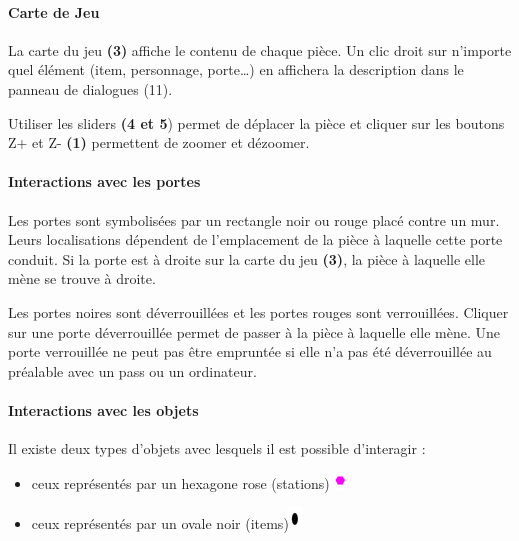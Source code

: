 \documentclass[./standalone.tex]{subfiles}
\begin{document}
\newpage


\paragraph{Carte de Jeu\\}
    La carte du jeu \textbf{(3)} affiche le contenu de chaque pièce. Un clic droit sur n’importe quel élément (item, personnage, porte…) en affichera la description dans le panneau de dialogues (11).
\par Utiliser les sliders \textbf{(4 et 5}) permet de déplacer la pièce et cliquer sur les boutons Z+ et Z- \textbf{(1)} permettent de zoomer et dézoomer.

\paragraph{Interactions avec les portes\\}
    Les portes sont symbolisées par un rectangle noir ou rouge placé contre un mur. Leurs localisations dépendent de l’emplacement de la pièce à laquelle cette porte conduit. Si la porte est à droite sur la carte du jeu \textbf{(3)}, la pièce à laquelle elle mène se trouve à droite. 
\par Les portes noires sont déverrouillées et les portes rouges sont verrouillées. Cliquer sur une porte déverrouillée permet de passer à la pièce à laquelle elle mène. Une porte verrouillée ne peut pas être empruntée si elle n’a pas été déverrouillée au préalable avec un pass ou un ordinateur.
        
\paragraph{Interactions avec les objets\\}
    Il existe deux types d’objets avec lesquels il est possible d’interagir :
    \begin{itemize}
    	\item ceux représentés par un hexagone rose (stations) \includegraphics[scale=1]{images/hexagone.png}
    	\item ceux représentés par un ovale noir (items)\includegraphics[scale=1]{images/ellipse.png}
    \end{itemize}
            
\end{document}
